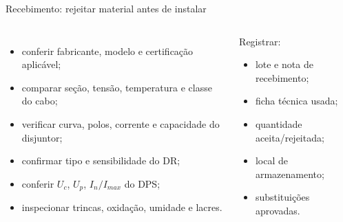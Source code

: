 \begin{frame}{Recebimento: rejeitar material antes de instalar}
\small
\begin{columns}[T,onlytextwidth]
\begin{itemize}
\item conferir fabricante, modelo e certificação aplicável;
\item comparar seção, tensão, temperatura e classe do cabo;
\item verificar curva, polos, corrente e capacidade do disjuntor;
\item confirmar tipo e sensibilidade do DR;
\item conferir $U_c$, $U_p$, $I_n/I_{max}$ do DPS;
\item inspecionar trincas, oxidação, umidade e lacres.
\end{itemize}
\begin{caixaProjeto}[title=Rastreabilidade]
Registrar:
\begin{itemize}
\item lote e nota de recebimento;
\item ficha técnica usada;
\item quantidade aceita/rejeitada;
\item local de armazenamento;
\item substituições aprovadas.
\end{itemize}
\end{caixaProjeto}
\end{columns}
\end{frame}

